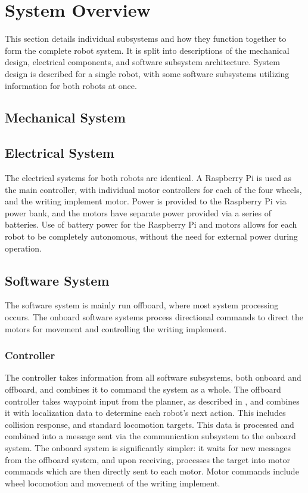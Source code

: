 \section{System Overview}
\label{sec:system_overview}

This section details individual subsystems and how they function together to form the complete robot system. It is split into descriptions of the mechanical design, electrical components, and software subsystem architecture. System design is described for a single robot, with some software subsystems utilizing information for both robots at once.

\subsection{Mechanical System}
\label{sec:mechanical}

\subsection{Electrical System}
\label{sec:electrical}
The electrical systems for both robots are identical. A Raspberry Pi is used as the main controller, with individual motor controllers for each of the four wheels, and the writing implement motor. Power is provided to the Raspberry Pi via power bank, and the motors have separate power provided via a series of batteries. Use of battery power for the Raspberry Pi and motors allows for each robot to be completely autonomous, without the need for external power during operation.

\subsection{Software System}
\label{sec:software}
The software system is mainly run offboard, where most system processing occurs. The onboard software systems process directional commands to direct the motors for movement and controlling the writing implement.

\subsubsection{Controller}
\label{sec:sw_controller}
The controller takes information from all software subsystems, both onboard and offboard, and combines it to command the system as a whole. The offboard controller takes waypoint input from the planner, as described in , and combines it with localization data to determine each robot's next action. This includes collision response, and standard locomotion targets. This data is processed and combined into a message sent via the communication subsystem to the onboard system. The onboard system is significantly simpler: it waits for new messages from the offboard system, and upon receiving, processes the target into motor commands which are then directly sent to each motor. Motor commands include wheel locomotion and movement of the writing implement.

